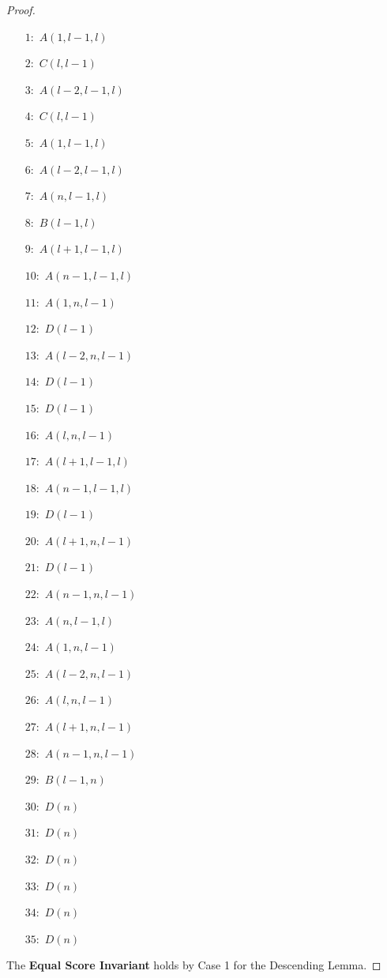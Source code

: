 \documentclass[10pt,a4paper]{article}
\begin{document}
\begin{proof}
\begin{minipage}[t]{0.3\textwidth}
\begin{enumerate}
\item[$1:$] $A(1, l - 1, l)$
\item[$2:$] $C(l, l - 1)$
\item[$3:$] $A(l - 2, l - 1, l)$
\item[$4:$] $C(l, l - 1)$
\item[$5:$] $A(1, l - 1, l)$
\item[$6:$] $A(l - 2, l - 1, l)$
\item[$7:$] $A(n, l - 1, l)$
\item[$8:$] $B(l - 1, l)$
\item[$9:$] $A(l + 1, l - 1, l)$
\item[$10:$] $A(n - 1, l - 1, l)$
\item[$11:$] $A(1, n, l - 1)$
\item[$12:$] $D(l - 1)$
\end{enumerate}
\end{minipage}
\hfill
\begin{minipage}[t]{0.3\textwidth}
\begin{enumerate}
\item[$13:$] $A(l - 2, n, l - 1)$
\item[$14:$] $D(l - 1)$
\item[$15:$] $D(l - 1)$
\item[$16:$] $A(l, n, l - 1)$
\item[$17:$] $A(l + 1, l - 1, l)$
\item[$18:$] $A(n - 1, l - 1, l)$
\item[$19:$] $D(l - 1)$
\item[$20:$] $A(l + 1, n, l - 1)$
\item[$21:$] $D(l - 1)$
\item[$22:$] $A(n - 1, n, l - 1)$
\item[$23:$] $A(n, l - 1, l)$
\item[$24:$] $A(1, n, l - 1)$
\end{enumerate}
\end{minipage}
\begin{minipage}[t]{0.3\textwidth}
\begin{enumerate}
\item[$25:$] $A(l - 2, n, l - 1)$
\item[$26:$] $A(l, n, l - 1)$
\item[$27:$] $A(l + 1, n, l - 1)$
\item[$28:$] $A(n - 1, n, l - 1)$
\item[$29:$] $B(l - 1, n)$
\item[$30:$] $D(n)$
\item[$31:$] $D(n)$
\item[$32:$] $D(n)$
\item[$33:$] $D(n)$
\item[$34:$] $D(n)$
\item[$35:$] $D(n)$
\end{enumerate}
\end{minipage}
\noindent The \textbf{Equal Score Invariant} holds by Case 1 for the Descending Lemma.


\end{proof}
\end{document}
